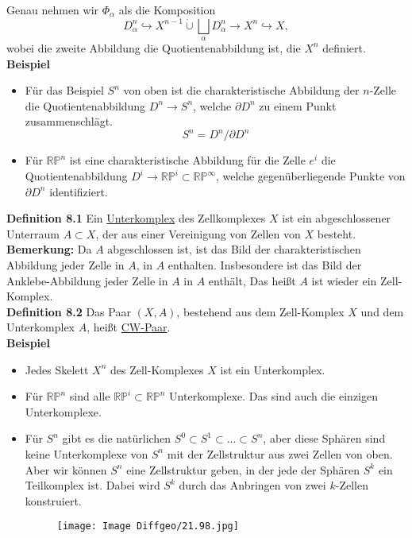 \documentclass[fleqn, 12pt, letterpaper]{article}
\begin{document}
Genau nehmen wir \( \Phi_\alpha \) als die Komposition
\[
D^n_\alpha \hookrightarrow X^{n-1} \dot{\cup} \bigsqcup_\alpha D^n_\alpha \to X^n \hookrightarrow X,
\]
wobei die zweite Abbildung die Quotientenabbildung ist, die \( X^n \) definiert.\\

\textbf{Beispiel}
\begin{itemize}
\item Für das Beispiel \( S^n \) von oben ist die charakteristische Abbildung der \( n \)-Zelle die Quotientenabbildung \( D^n \to S^n \),
welche \( \partial D^n \) zu einem Punkt zusammenschlägt.
\[S^n=D^n/\partial D^n\]

\item Für \( \mathbb{RP}^n \) ist eine charakteristische Abbildung für die Zelle \( e^i \) die Quotientenabbildung 
\( D^i \to \mathbb{RP}^i \subset \mathbb{RP}^\infty \), welche gegenüberliegende Punkte von \( \partial D^n \) identifiziert.
\end{itemize}

\textbf{Definition 8.1} Ein \underline{Unterkomplex} des Zellkomplexes \( X \) ist ein abgeschlossener Unterraum \( A \subset X \), 
der aus einer Vereinigung von Zellen von \( X \) besteht.\\

\textbf{Bemerkung:} Da \( A \) abgeschlossen ist, ist das Bild der charakteristischen Abbildung jeder Zelle in \( A \), in \( A \) enthalten.
Insbesondere ist das Bild der Anklebe-Abbildung jeder Zelle in \( A \) in $A$ enthält, Das heißt \( A \) ist wieder ein Zell-Komplex.\\

\textbf{Definition 8.2} Das Paar \( (X,A) \), bestehend aus dem Zell-Komplex \( X \) und dem Unterkomplex \( A \), heißt 
\underline{CW-Paar}.\\

\textbf{Beispiel} 
\begin{itemize}
\item Jedes Skelett \( X^n \) des Zell-Komplexes \( X \) ist ein Unterkomplex.
\item Für \( \mathbb{RP}^n \) sind alle \( \mathbb{RP}^i\subset \mathbb{RP}^n \) Unterkomplexe. Das sind auch die einzigen Unterkomplexe.
\item Für \( S^n \) gibt es die natürlichen \(S^0\subset S^1\subset... \subset S^n \), aber diese Sphären sind keine Unterkomplexe von \( S^n \) mit der Zellstruktur aus zwei Zellen von oben.
Aber wir können \( S^n \) eine Zellstruktur geben, in der jede der Sphären \( S^k \) ein Teilkomplex ist.
Dabei wird \( S^k \) durch das Anbringen von zwei \( k \)-Zellen konstruiert.

\begin{figure}[H]
    \centering
    \texttt{[image: Image Diffgeo/21.98.jpg]}
 \end{figure}
\end{itemize}
\end{document}
